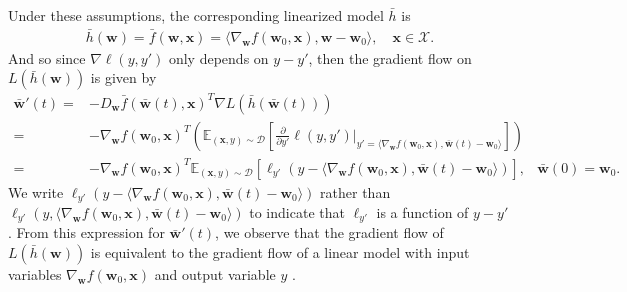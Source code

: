 \documentclass{article}
\begin{document}
Under these assumptions, the corresponding linearized model $\bar{h}$ is
\begin{align*}
    \bar{h}(\boldsymbol{w}) = \bar{f}(\boldsymbol{w}, \boldsymbol{x}) = \langle \nabla_{\boldsymbol{w}} f(\boldsymbol{w}_0, \boldsymbol{x}), \boldsymbol{w}-\boldsymbol{w}_0\rangle, \quad \boldsymbol{x} \in \mathcal{X}. 
\end{align*}
And so since $\nabla \ell(y, y')$ only depends on $y - y'$, then the gradient flow on $L(\bar{h}(\boldsymbol{w}))$ is given by
\begin{align*}
    \boldsymbol{\bar{w}}'(t) =& - D_{\boldsymbol{w}}\bar{f}(\boldsymbol{\bar{w}}(t), \boldsymbol{x})^T \nabla L(\bar{h}(\boldsymbol{\bar{w}}(t)))\\
    =& -\nabla_{\boldsymbol{w}}f(\boldsymbol{w}_0, \boldsymbol{x})^T \left(\mathbb{E}_{(\boldsymbol{x}, y) \sim \mathcal{D}} \left[ \frac{\partial}{\partial y'}\ell(y, y')\bigg|_{y' = \langle \nabla_{\boldsymbol{w}} f(\boldsymbol{w}_0, \boldsymbol{x}), \boldsymbol{\bar{w}}(t)-\boldsymbol{w}_0\rangle} \right] \right)\\
    =& -\nabla_{\boldsymbol{w}}f(\boldsymbol{w}_0, \boldsymbol{x})^T \mathbb{E}_{(\boldsymbol{x}, y) \sim \mathcal{D}} \left[ \ell_{y'}(y - \langle \nabla_{\boldsymbol{w}} f(\boldsymbol{w}_0, \boldsymbol{x}), \boldsymbol{\bar{w}}(t)-\boldsymbol{w}_0\rangle) \right],
    & \boldsymbol{\bar{w}}(0) = \boldsymbol{w}_0.
\end{align*}
We write $\ell_{y'}(y - \langle \nabla_{\boldsymbol{w}} f(\boldsymbol{w}_0, \boldsymbol{x}), \boldsymbol{\bar{w}}(t)-\boldsymbol{w}_0\rangle)$ rather than $\ell_{y'}(y, \langle \nabla_{\boldsymbol{w}} f(\boldsymbol{w}_0, \boldsymbol{x}), \boldsymbol{\bar{w}}(t)-\boldsymbol{w}_0\rangle)$ to indicate that $\ell_{y'}$ is a function of $y - y'$. From this expression for $\boldsymbol{\bar{w}}'(t)$, we observe that the gradient flow of $L(\bar{h}(\boldsymbol{w}))$ is equivalent to the gradient flow of a linear model with input variables $\nabla_{\boldsymbol{w}} f(\boldsymbol{w}_0, \boldsymbol{x})$ and output variable $y$ \cite{chizat2018note}. 
\end{document}
